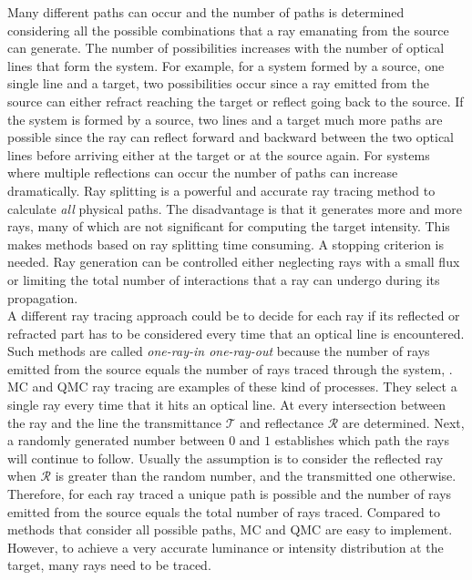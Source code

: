 Many different paths can occur and the number of paths is determined considering all the possible combinations that a ray emanating from the source can generate. The number of possibilities increases with the number of optical lines that form the system. For example, for a system formed by a source, one single line and a target, two possibilities occur since a ray emitted from the source can either refract reaching the target or reflect going back to the source. If the system is formed by a source, two lines and a target much more paths are possible since the ray can reflect forward and backward between the two optical lines before arriving either at the target or at the source again. For systems where multiple reflections can occur the number of paths can increase dramatically. Ray splitting is a powerful and accurate ray tracing method to calculate \textit{all} physical paths. The disadvantage is that it generates more and more rays, many of which are not significant for computing the target intensity. This makes methods based on ray splitting time consuming. A stopping criterion is needed. Ray generation can be controlled either neglecting rays with a small flux or limiting the total number of interactions that a ray can undergo during its propagation. \\ \indent A different ray tracing approach could be to decide for each ray if its reflected or refracted part has to be considered every time that an optical line is encountered. Such methods are called \textit{one-ray-in one-ray-out} because the number of rays emitted from the source equals the number of rays traced through the system, \cite{koshel2012illumination}. MC and QMC ray tracing are examples of these kind of processes. They select a single ray every time that it hits an optical line. At every intersection between the ray and the line the transmittance $\mathcal{T}$ and reflectance $\mathcal{R}$ are determined. Next, a randomly generated number between $0$ and $1$ establishes which path the rays will continue to follow. 
Usually the assumption is to consider the reflected ray when $\mathcal{R}$ is greater than the random number, and the transmitted one otherwise. 
Therefore, for each ray traced a unique path is possible and the number of rays emitted from the source equals the total number of rays traced. Compared to methods that consider all possible paths, MC and QMC are easy to implement. However, to achieve a very accurate luminance or intensity distribution at the target, many rays need to be traced.
\\ \indent 
